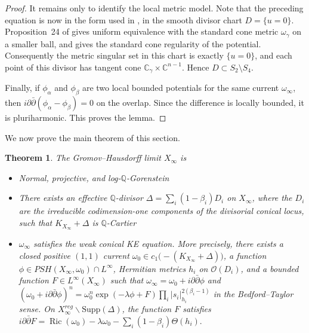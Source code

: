 \documentclass[11pt]{amsart}
\newtheorem{theorem}{Theorem}[section]
\theoremstyle{definition}
\theoremstyle{remark}
\begin{document}
\begin{proof}
It remains only to identify the local metric model. Note that the preceding
equation is now in the form used in \cite[Section~3.2]{CDSII}, in the smooth
divisor chart $D=\{u=0\}$. Proposition~24 of \cite{CDSII} gives uniform
equivalence with the standard cone metric $\omega_\gamma$ on a smaller ball,
and \cite[Proposition~27]{CDSII} gives the standard cone regularity of the
potential.
Consequently the metric singular set in this chart is exactly $\{u=0\}$, and
each point of this divisor has tangent cone
$\mathbb C_\gamma\times\mathbb C^{n-1}$. Hence $D\subset S_2\setminus S_4$.

Finally, if $\phi_\alpha$ and $\phi_\beta$ are two local bounded potentials for
the same current $\omega_\infty$, then
$i\partial\bar\partial(\phi_\alpha-\phi_\beta)=0$ on the overlap. Since the
difference is locally bounded, it is pluriharmonic. This proves the lemma.
\end{proof}

We now prove the main theorem of this section.

\begin{theorem}
The Gromov--Hausdorff limit $X_\infty$ is 
\begin{itemize}
    \item Normal, projective, and log-$\mathbb{Q}$-Gorenstein
    \item There exists an effective $\mathbb{Q}$-divisor $\Delta = \sum_i (1-\beta_i) D_i$ on $X_\infty$, where the $D_i$ are the irreducible codimension-one components of the divisorial conical locus, such that $K_{X_\infty} + \Delta$ is $\mathbb{Q}$-Cartier
    \item $\omega_\infty$ satisfies the weak conical KE equation. More precisely, there exists a closed positive $(1,1)$ current $\omega_0\in c_1\bigl(-(K_{X_\infty}+\Delta)\bigr)$, a function $\phi \in PSH(X_\infty, \omega_0) \cap L^\infty$, Hermitian metrics $h_i$ on $\mathcal O(D_i)$, and a bounded function $F \in L^\infty(X_\infty)$ such that
$\omega_\infty = \omega_0 + i \partial \bar{\partial} \phi$
and
$(\omega_0 + i \partial \bar{\partial} \phi)^n = \omega_0^n \exp(-\lambda \phi + F) \prod_i |s_i|_{h_i}^{2(\beta_i-1)}$
in the Bedford--Taylor sense. On $X_\infty^{reg} \backslash \mathrm{Supp}(\Delta)$, the function $F$ satisfies
$i \partial \bar{\partial} F = \operatorname{Ric}(\omega_0) - \lambda \omega_0 - \sum_i (1-\beta_i)\Theta(h_i).$
\end{itemize} 
\end{theorem}
\end{document}
